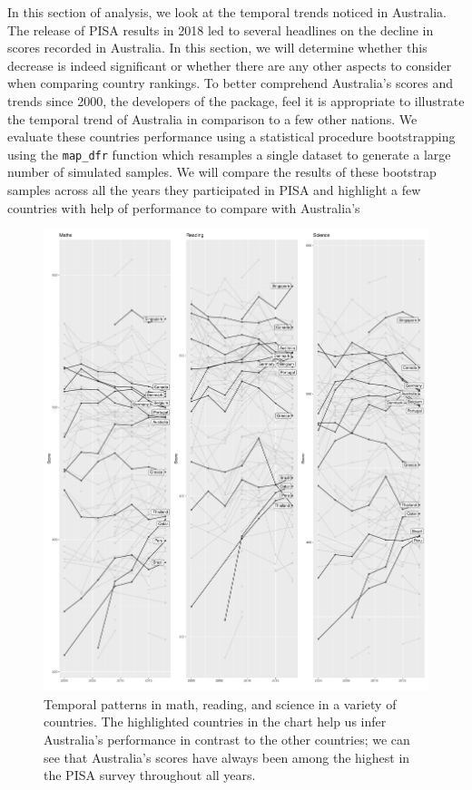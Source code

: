 In this section of analysis, we look at the temporal trends noticed in
Australia. The release of PISA results in 2018 led to several headlines
on the decline in scores recorded in Australia. In this section, we will
determine whether this decrease is indeed significant or whether there
are any other aspects to consider when comparing country rankings. To
better comprehend Australia's scores and trends since 2000, the
developers of the  package, feel it is
appropriate to illustrate the temporal trend of Australia in comparison
to a few other nations. We evaluate these countries performance using a
statistical procedure bootstrapping using the \texttt{map\_dfr} function
which resamples a single dataset to generate a large number of simulated
samples. We will compare the results of these bootstrap samples across
all the years they participated in PISA and highlight a few countries
with help of  \citep{gghighlight} performance to
compare with Australia's

\begin{Schunk}
\begin{figure}[H]
\includegraphics[width=1\linewidth]{learningtower_files/figure-latex/bs-plot-1} \caption[Temporal patterns in math, reading, and science in a variety of countries]{Temporal patterns in math, reading, and science in a variety of countries. The highlighted countries in the chart help us infer Australia's performance in contrast to the other countries; we can see that Australia's scores have always been among the highest in the PISA survey throughout all years.}\label{fig:bs-plot}
\end{figure}
\end{Schunk}

